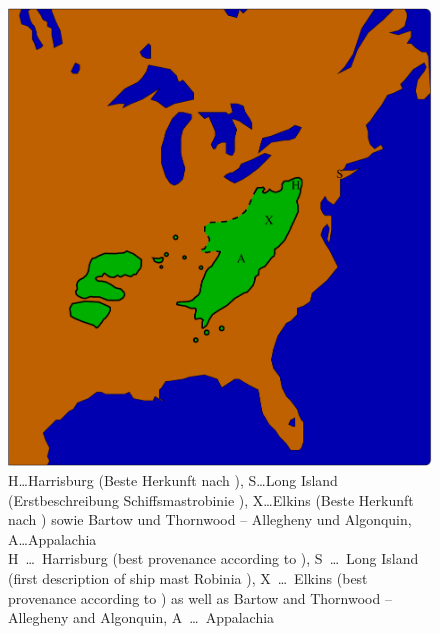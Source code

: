 \documentclass[twocolumn]{scrartcl}
\begin{document}
\begin{figure}[htbp]
  \centering
  \includegraphics[width=.9\linewidth]{./bild/map4}
  \footnotesize{H\dots Harrisburg (Beste Herkunft nach \citet{cobbett1825woodlands}),
    S\dots Long Island (Erstbeschreibung Schiffsmastrobinie \citet{raber1936shipmast}),
    X\dots Elkins (Beste Herkunft nach \citet{hopp1941robinie}) sowie Bartow und Thornwood -- Allegheny und Algonquin,
    A\dots Appalachia\\
    H~\dots~Harrisburg (best provenance according to \citet{cobbett1825woodlands}),
    S~\dots~Long Island (first description of ship mast Robinia \citep{raber1936shipmast}),
    X~\dots~Elkins (best provenance according to \citet{hopp1941robinie}) as well as Bartow and Thornwood -- Allegheny and Algonquin,
    A~\dots~Appalachia
  }
  \label{fig:verbreitungNatuerlich}
\end{figure}
\end{document}

